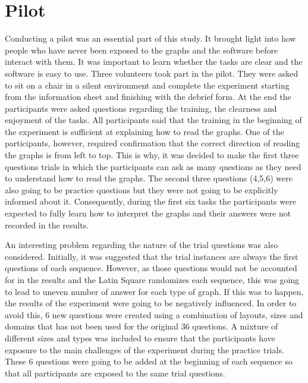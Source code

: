\documentclass{l4proj}
\begin{document}
\section{Pilot}

Conducting a pilot was an essential part of this study. It brought light into how people who have never been exposed to the graphs and the software before interact with them. It was important to learn whether the tasks are clear and the software is easy to use. Three volunteers took part in the pilot. They were asked to sit on a chair in a silent environment and complete the experiment starting from the information sheet and finishing with the debrief form. At the end the participants were asked questions regarding the training, the clearness and enjoyment of the tasks. All participants said that the training in the beginning of the experiment is sufficient at explaining how to read the graphs. One of the participants, however, required confirmation that the correct direction of reading the graphs is from left to top. This is why, it was decided to make the first three questions trials in which the participants can ask as many questions as they need to understand how to read the graphs. The second three questions (4,5,6) were also going to be practice questions but they were not going to be explicitly informed about it. Consequently, during the first six tasks the participants were expected to fully learn how to interpret the graphs and their answers were not recorded in the results. 

An interesting problem regarding the nature of the trial questions was also considered. Initially, it was suggested that the trial instances are always the first questions of each sequence. However, as those questions would not be accounted for in the results and the Latin Square randomizes each sequence, this was going to lead to uneven number of answer for each type of graph. If this was to happen, the results of the experiment were going to be negatively influenced. In order to avoid this, 6 new questions were created using a combination of layouts, sizes and domains that has not been used for the original 36 questions. A mixture of different sizes and types was included to ensure that the participants have exposure to the main challenges of the experiment during the practice trials. These 6 questions were going to be added at the beginning of each sequence so that all participants are exposed to the same trial questions.  
\end{document}
